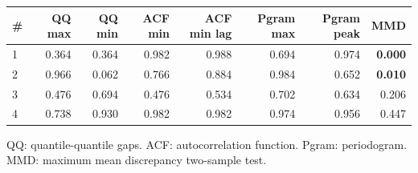 \documentclass[11pt,a4paper]{article}
\begin{document}
\begin{center}
\begin{tabular}{lrrrrrrr}
\toprule
\# & QQ max & QQ min & ACF min & ACF min lag & Pgram max & Pgram peak & MMD \\
\midrule
1 & 0.364 & 0.364 & 0.982 & 0.988 & 0.694 & 0.974 & \textbf{0.000} \\
2 & 0.966 & 0.062 & 0.766 & 0.884 & 0.984 & 0.652 & \textbf{0.010} \\
3 & 0.476 & 0.694 & 0.476 & 0.534 & 0.702 & 0.634 & 0.206 \\
4 & 0.738 & 0.930 & 0.982 & 0.982 & 0.974 & 0.956 & 0.447 \\
\bottomrule
\end{tabular}
\end{center}

QQ: quantile-quantile gaps. ACF: autocorrelation function. Pgram: periodogram. MMD: maximum mean discrepancy two-sample test.
\end{document}
